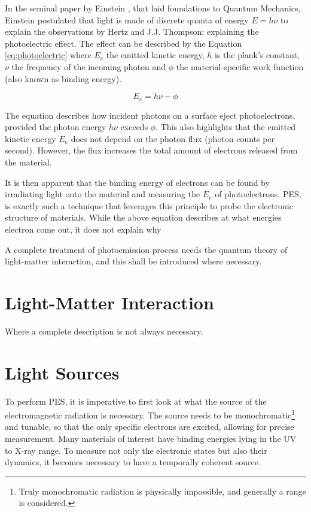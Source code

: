 In the seminal paper by Einstein \cite{einsteinUberErzeugungUnd1905}, that laid foundations to Quantum Mechanics, Einstein postulated that light is made of discrete quanta of energy $E = h\nu$ to explain the observations by Hertz and J.J. Thompson; explaining the photoelectric effect. The effect can be described by the Equation \ref{eq:photoelectric} where $E_e$ the emitted kinetic energy, $h$ is the plank's constant, $\nu$ the frequency of the incoming photon and  $\phi$ the material-specific work function (also known as binding energy). 

\begin{equation}\label{eq:photoelectric}
    E_e = h\nu - \phi
\end{equation}

The equation describes how incident photons on a surface eject photoelectrons, provided the photon energy $h\nu$ exceeds $\phi$. This also highlights that the emitted kinetic energy $E_e$ does not depend on the photon flux (photon counts per second). However, the flux increases the total amount of electrons released from the material.

It is then apparent that the binding energy of electrons can be found by irradiating light onto the material and measuring the $E_e$ of photoelectrons. \gls{PES}, is exactly such a technique that leverages this principle to probe the electronic structure of materials. While the above equation describes at what energies electron come out, it does not explain why 



A complete treatment of photoemission process needs the quantum theory of light-matter interaction, and this shall be introduced where necessary. 

\section{Light-Matter Interaction}\label{section:light-matter-interaction}
Where a complete description is not always necessary.

\section{Light Sources}\label{section:light-sources}
To perform \gls{PES}, it is imperative to first look at what the source of the electromagnetic radiation is necessary. The source needs to be monochromatic\footnote{Truly monochromatic radiation is physically impossible, and generally a range is considered.} and tunable, so that the only specific electrons are excited, allowing for precise measurement. Many materials of interest have binding energies lying in the UV to X-ray range. To measure not only the electronic states but also their dynamics, it becomes necessary to have a temporally coherent source.



